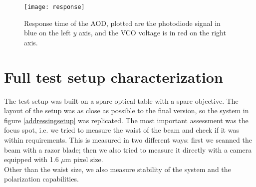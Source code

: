 \begin{figure}
\centering
\texttt{[image: response]}
\caption{Response time of the AOD, plotted are the photodiode signal in blue on the left $y$ axis, and the VCO voltage is in red on the right axis.}
\label{response}
\end{figure}

\section{Full test setup characterization}
The test setup was built on a spare optical table with a spare objective. The layout of the setup was as close as possible to the final version, so the system in figure \ref{addressingsetup} was replicated. The most important assessment was the focus spot, i.e. we tried to measure the waist of the beam and check if it was within requirements.
This is measured in two different ways: first we scanned the beam with a razor blade; then we also tried to measure it directly with a camera equipped with 1.6 $\mu$m pixel size.\\
Other than the waist size, we also measure stability of the system and the polarization capabilities.

